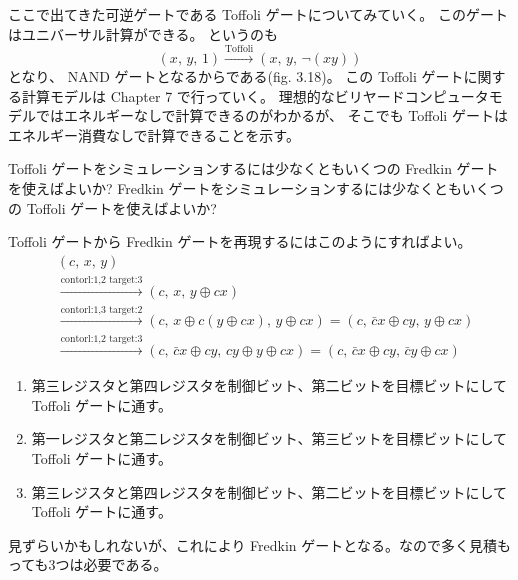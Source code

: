 \documentclass[../../master.tex]{subfiles}
\begin{document}
ここで出てきた可逆ゲートである Toffoli ゲートについてみていく。
このゲートはユニバーサル計算ができる。
というのも
\begin{equation*}
    (x,\,y,\,1)
    \overset{\text{Toffoli}}{\longrightarrow} (x,\,y,\,\neg (xy))
\end{equation*}
となり、 NAND ゲートとなるからである(fig. 3.18)。
この Toffoli ゲートに関する計算モデルは Chapter 7 で行っていく。
理想的なビリヤードコンピュータモデルではエネルギーなしで計算できるのがわかるが、
そこでも Toffoli ゲートはエネルギー消費なしで計算できることを示す。
\begin{tcolorbox}[title = Fredkin と Toffoli の等価性]
    Toffoli ゲートをシミュレーションするには少なくともいくつの Fredkin ゲートを使えばよいか?
    Fredkin ゲートをシミュレーションするには少なくともいくつの Toffoli ゲートを使えばよいか?
\end{tcolorbox}
Toffoli ゲートから Fredkin ゲートを再現するにはこのようにすればよい。
\begin{equation*}\begin{split}
        &(c,\,x,\,y)\\
        &\overset{\text{contorl:1,2 target:3}}{\longrightarrow} (c,\,x,\,y\oplus cx)\\
        &\overset{\text{contorl:1,3 target:2}}{\longrightarrow} (c,\,x \oplus c(y\oplus cx),\,y \oplus cx)
        =(c,\,\bar{c}x\oplus cy,\,y\oplus cx)\\
        &\overset{\text{contorl:1,2 target:3}}{\longrightarrow} (c,\,\bar{c}x\oplus cy,\, cy \oplus y\oplus cx)
        =(c,\,\bar{c}x \oplus cy,\,\bar{c}y\oplus cx)
\end{split}\end{equation*}
\begin{enumerate}
    \item 第三レジスタと第四レジスタを制御ビット、第二ビットを目標ビットにして Toffoli ゲートに通す。
    \item 第一レジスタと第二レジスタを制御ビット、第三ビットを目標ビットにして Toffoli ゲートに通す。
    \item 第三レジスタと第四レジスタを制御ビット、第二ビットを目標ビットにして Toffoli ゲートに通す。
\end{enumerate}
見ずらいかもしれないが、これにより Fredkin ゲートとなる。なので多く見積もっても3つは必要である。
\end{document}
